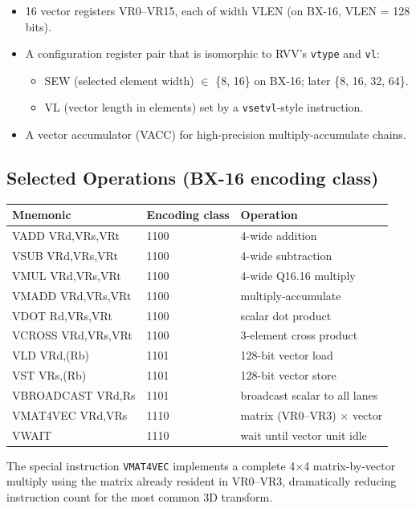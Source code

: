 \documentclass[11pt,a4paper]{article}
\begin{document}
\begin{itemize}[leftmargin=1.5em]
  \item 16 vector registers VR0--VR15, each of width VLEN (on BX-16, VLEN = 128 bits).
  \item A configuration register pair that is isomorphic to RVV's \texttt{vtype} and \texttt{vl}:
    \begin{itemize}
      \item SEW (selected element width) $\in$ \{8, 16\} on BX-16; later \{8, 16, 32, 64\}.
      \item VL (vector length in elements) set by a \texttt{vsetvl}-style instruction.
    \end{itemize}
  \item A vector accumulator (VACC) for high-precision multiply-accumulate chains.
\end{itemize}

\subsection{Selected Operations (BX-16 encoding class)}

\begin{center}
\begin{tabular}{@{}llp{5.5cm}@{}}
\toprule
Mnemonic & Encoding class & Operation \\
\midrule
VADD VRd,VRs,VRt & 1100 & 4-wide addition \\
VSUB VRd,VRs,VRt & 1100 & 4-wide subtraction \\
VMUL VRd,VRs,VRt & 1100 & 4-wide Q16.16 multiply \\
VMADD VRd,VRs,VRt & 1100 & multiply-accumulate \\
VDOT Rd,VRs,VRt & 1100 & scalar dot product \\
VCROSS VRd,VRs,VRt & 1100 & 3-element cross product \\
VLD VRd,(Rb) & 1101 & 128-bit vector load \\
VST VRs,(Rb) & 1101 & 128-bit vector store \\
VBROADCAST VRd,Rs & 1101 & broadcast scalar to all lanes \\
VMAT4VEC VRd,VRs & 1110 & matrix (VR0--VR3) $\times$ vector \\
VWAIT & 1110 & wait until vector unit idle \\
\bottomrule
\end{tabular}
\end{center}

The special instruction \texttt{VMAT4VEC} implements a complete 4$\times$4 matrix-by-vector multiply using the matrix already resident in VR0--VR3, dramatically reducing instruction count for the most common 3D transform.
\end{document}
